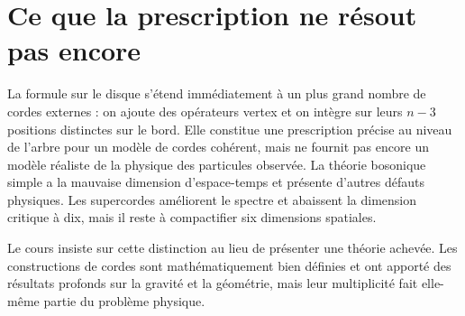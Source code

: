 \section{Ce que la prescription ne résout pas encore}

La formule sur le disque s’étend immédiatement à un plus grand nombre de cordes externes : on ajoute des opérateurs vertex et on intègre sur leurs \(n-3\) positions distinctes sur le bord. Elle constitue une prescription précise au niveau de l’arbre pour un modèle de cordes cohérent, mais ne fournit pas encore un modèle réaliste de la physique des particules observée. La théorie bosonique simple a la mauvaise dimension d’espace-temps et présente d’autres défauts physiques. Les supercordes améliorent le spectre et abaissent la dimension critique à dix, mais il reste à compactifier six dimensions spatiales.

\begin{classroomqa}
\end{classroomqa}

\begin{classroomqa}
\end{classroomqa}

Le cours insiste sur cette distinction au lieu de présenter une théorie achevée. Les constructions de cordes sont mathématiquement bien définies et ont apporté des résultats profonds sur la gravité et la géométrie, mais leur multiplicité fait elle-même partie du problème physique.

